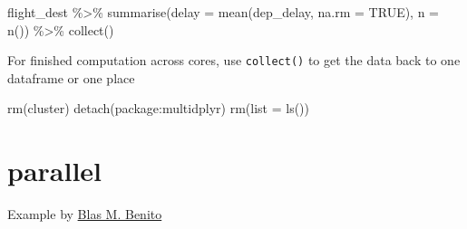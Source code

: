 \documentclass[
]{book}
\newenvironment{Shaded}{\begin{snugshade}}{\end{snugshade}}
\newcommand{\AttributeTok}[1]{\textcolor[rgb]{0.77,0.63,0.00}{#1}}
\newcommand{\ConstantTok}[1]{\textcolor[rgb]{0.00,0.00,0.00}{#1}}
\newcommand{\FunctionTok}[1]{\textcolor[rgb]{0.00,0.00,0.00}{#1}}
\newcommand{\NormalTok}[1]{#1}
\newcommand{\SpecialCharTok}[1]{\textcolor[rgb]{0.00,0.00,0.00}{#1}}
\begin{document}
\begin{Shaded}
\begin{Highlighting}[]
\NormalTok{flight\_dest }\SpecialCharTok{\%\textgreater{}\%} 
  \FunctionTok{summarise}\NormalTok{(}\AttributeTok{delay =} \FunctionTok{mean}\NormalTok{(dep\_delay, }\AttributeTok{na.rm =} \ConstantTok{TRUE}\NormalTok{), }\AttributeTok{n =} \FunctionTok{n}\NormalTok{()) }\SpecialCharTok{\%\textgreater{}\%} 
  \FunctionTok{collect}\NormalTok{()}
\end{Highlighting}
\end{Shaded}

For finished computation across cores, use \texttt{collect()} to get the data back to one dataframe or one place

\begin{Shaded}
\begin{Highlighting}[]
\FunctionTok{rm}\NormalTok{(cluster)}
\FunctionTok{detach}\NormalTok{(package}\SpecialCharTok{:}\NormalTok{multidplyr)}
\FunctionTok{rm}\NormalTok{(}\AttributeTok{list =} \FunctionTok{ls}\NormalTok{())}
\end{Highlighting}
\end{Shaded}

\hypertarget{parallel}{%
\section{parallel}\label{parallel}}

Example by \href{https://www.blasbenito.com/post/02_parallelizing_loops_with_r/}{Blas M. Benito}
\end{document}
